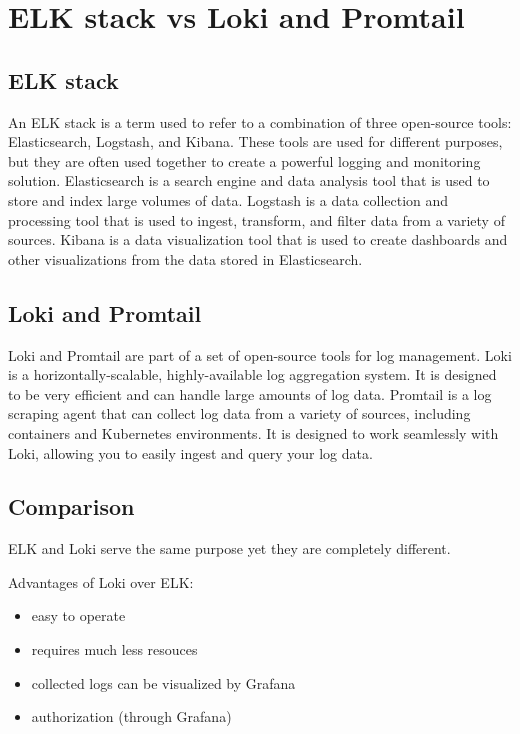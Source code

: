 \section{ELK stack vs Loki and Promtail}

\subsection{ELK stack \label{bbElk}}

An ELK stack\cite{elk} is a term used to refer to a combination of three open-source
tools: Elasticsearch, Logstash, and Kibana. These tools are used for different
purposes, but they are often used together to create a powerful logging and
monitoring solution. Elasticsearch is a search engine and data analysis tool
that is used to store and index large volumes of data. Logstash is a data
collection and processing tool that is used to ingest, transform, and filter
data from a variety of sources. Kibana is a data visualization tool that is
used to create dashboards and other visualizations from the data stored in
Elasticsearch.

\subsection{Loki and Promtail}

Loki and Promtail\cite{lp} are part of a set of open-source tools for log management.
Loki is a horizontally-scalable, highly-available log aggregation system. It is
designed to be very efficient and can handle large amounts of log data.
Promtail is a log scraping agent that can collect log data from a variety of
sources, including containers and Kubernetes environments. It is designed to
work seamlessly with Loki, allowing you to easily ingest and query your log
data.

\subsection{Comparison}

ELK and Loki serve the same purpose yet they are completely different.

Advantages of Loki over ELK:
\begin{itemize}
	\item easy to operate
	\item requires much less resouces
	\item collected logs can be visualized by Grafana
	\item authorization (through Grafana)
\end{itemize}

